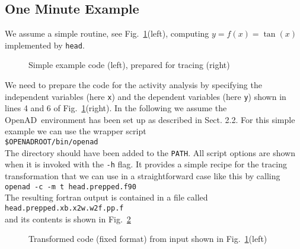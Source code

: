 \documentclass{article}
\newcommand{\openad}{OpenAD}
\newcommand{\reffig}[1]{{Fig.~\ref{#1}}}
\begin{document}
\subsection{One Minute Example}
We assume a simple routine, see \reffig{fig:OneMinute}(left), computing $y=f(x)=\tan(x)$ implemented by \lstinline{head}.
\begin{figure}
\begin{minipage}[t]{.48\linewidth}

\end{minipage}
\begin{minipage}[t]{.48\linewidth}

\end{minipage}
\caption{Simple example code (left), prepared for tracing (right)}\label{fig:OneMinute}
\end{figure}
We need to prepare the code for the activity analysis by specifying the independent variables
(here \lstinline{x}) and the dependent variables 
(here \lstinline{y}) shown in lines 4 and 6 of \reffig{fig:OneMinute}(right).
In the following we assume the \openad\ environment has been set up as 
described in \cite{userManual} Sect. 2.2.
For this simple example we can use the  wrapper script\\[1ex]
\hspace*{1cm}\lstinline{$OPENADROOT/bin/openad}\\[1ex] %
The directory should have been added to the \lstinline{PATH}.
All script options are shown when  it is invoked with the \lstinline{-h} flag. 
It provides a simple recipe for the tracing transformation that we can use in 
a straightforward case like this by calling \\[1ex] 
\hspace*{1cm}\lstinline{openad -c -m t head.prepped.f90}\\[1ex]
The resulting fortran output is contained in a file called\\[1ex]
\hspace*{1cm}\lstinline{head.prepped.xb.x2w.w2f.pp.f}\\[1ex] 
and its contents is shown in \reffig{fig:OneMinuteTransformed}  
\begin{figure}

\caption{Transformed code (fixed format) from input shown in \reffig{fig:OneMinute}(left)}\label{fig:OneMinuteTransformed}
\end{figure}
\end{document}
